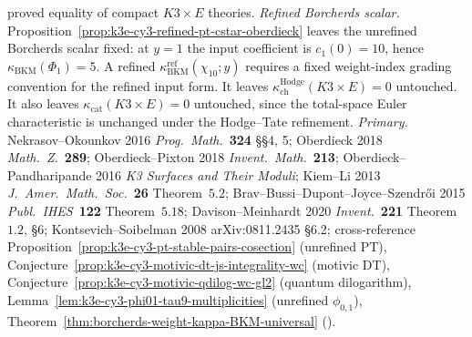\begin{remark}
proved equality of compact \(K3\times E\) theories.
\emph{Refined Borcherds scalar.}
Proposition~\ref{prop:k3e-cy3-refined-pt-cstar-oberdieck} leaves the
unrefined Borcherds scalar fixed: at \(y=1\) the input coefficient is
\(c_1(0)=10\), hence \(\kappa_{\mathrm{BKM}}(\Phi_1)=5\). A refined
\(\kappa_{\mathrm{BKM}}^{\mathrm{ref}}(\chi_{10};y)\) requires a fixed
weight-index grading convention for the refined input form.
It leaves $\kappa_{\mathrm{ch}}^{\mathrm{Hodge}}(K3 \times E) = 0$ untouched.
It also leaves $\kappa_{\mathrm{cat}}(K3 \times E) = 0$ untouched, since the total-space Euler characteristic is unchanged under the Hodge--Tate refinement.
\emph{Primary.} Nekrasov--Okounkov 2016 \emph{Prog.\ Math.}~\textbf{324} \S\S 4, 5; Oberdieck 2018 \emph{Math.\ Z.}~\textbf{289}; Oberdieck--Pixton 2018 \emph{Invent.\ Math.}~\textbf{213}; Oberdieck--Pandharipande 2016 \emph{K3 Surfaces and Their Moduli}; Kiem--Li 2013 \emph{J.\ Amer.\ Math.\ Soc.}~\textbf{26} Theorem~$5.2$; Brav--Bussi--Dupont--Joyce--Szendr\H oi 2015 \emph{Publ.\ IHES}~\textbf{122} Theorem~$5.18$; Davison--Meinhardt 2020 \emph{Invent.}~\textbf{221} Theorem~$1.2$, \S 6; Kontsevich--Soibelman 2008 arXiv:0811.2435 \S 6.2; cross-reference Proposition~\ref{prop:k3e-cy3-pt-stable-pairs-cosection} (unrefined PT), Conjecture~\ref{prop:k3e-cy3-motivic-dt-js-integrality-wc} (motivic DT), Conjecture~\ref{prop:k3e-cy3-motivic-qdilog-wc-gl2} (quantum dilogarithm), Lemma~\ref{lem:k3e-cy3-phi01-tau9-multiplicities} (unrefined $\phi_{0, 1}$), Theorem~\ref{thm:borcherds-weight-kappa-BKM-universal} (\cite{VolI}).
\end{remark}

